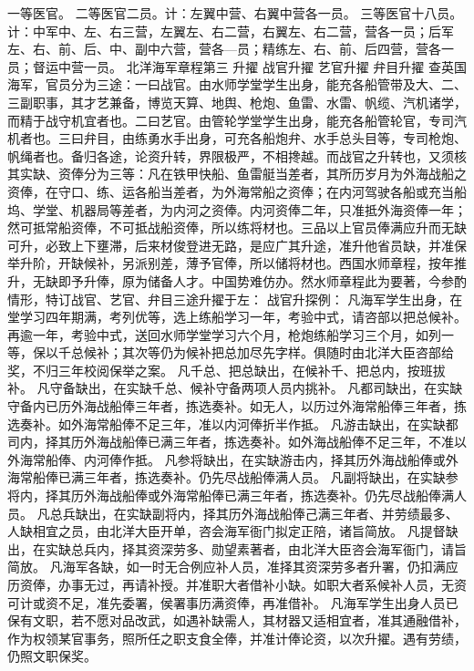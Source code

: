 \documentclass[12pt,UTF8]{ctexbook}
\begin{document}
一等医官。
二等医官二员。计：左翼中营、右翼中营各一员。
三等医官十八员。计：中军中、左、右三营，左翼左、右二营，右翼左、右二营，营各一员；后军左、右、前、后、中、副中六营，营各—员；精练左、右、前、后四营，营各一员；督运中营一员。
北洋海军章程第三
升擢 战官升擢 艺官升擢 弁目升擢
查英国海军，官员分为三途：一曰战官。由水师学堂学生出身，能充各船管带及大、二、三副职事，其才艺兼备，博览天算、地舆、枪炮、鱼雷、水雷、帆缆、汽机诸学，而精于战守机宜者也。二曰艺官。由管轮学堂学生出身，能充各船管轮官，专司汽机者也。三曰弁目，由练勇水手出身，可充各船炮弁、水手总头目等，专司枪炮、帆绳者也。备归各途，论资升转，界限极严，不相搀越。而战官之升转也，又须核其实缺、资俸分为三等：凡在铁甲快船、鱼雷艇当差者，其所历岁月为外海战船之资俸，在守口、练、运各船当差者，为外海常船之资俸；在内河驾驶各船或充当船坞、学堂、机器局等差者，为内河之资俸。内河资俸二年，只准抵外海资俸一年；然可抵常船资俸，不可抵战船资俸，所以练将材也。三品以上官员俸满应升而无缺可升，必致上下壅滞，后来材俊登进无路，是应广其升途，准升他省员缺，并准保举升阶，开缺候补，另派别差，薄予官俸，所以储将材也。西国水师章程，按年推升，无缺即予升俸，原为储备人才。中国势难仿办。然水师章程此为要著，今参酌情形，特订战官、艺官、弁目三途升擢于左：
战官升探例：
凡海军学生出身，在堂学习四年期满，考列优等，选上练船学习一年，考验中式，请咨部以把总候补。再逾一年，考验中式，送回水师学堂学习六个月，枪炮练船学习三个月，如列一等，保以千总候补；其次等仍为候补把总加尽先字样。俱随时由北洋大臣咨部给奖，不归三年校阅保举之案。
凡千总、把总缺出，在候补千、把总内，按班拔补。
凡守备缺出，在实缺千总、候补守备两项人员内挑补。
凡都司缺出，在实缺守备内已历外海战船俸三年者，拣选奏补。如无人，以历过外海常船俸三年者，拣选奏补。如外海常船俸不足三年，准以内河俸折半作抵。
凡游击缺出，在实缺都司内，择其历外海战船俸已满三年者，拣选奏补。如外海战船俸不足三年，不准以外海常船俸、内河俸作抵。
凡参将缺出，在实缺游击内，择其历外海战船俸或外海常船俸已满三年者，拣选奏补。仍先尽战船俸满人员。
凡副将缺出，在实缺参将内，择其历外海战船俸或外海常船俸已满三年者，拣选奏补。仍先尽战船俸满人员。
凡总兵缺出，在实缺副将内，择其历外海战船俸己满三年者、并劳绩最多、人缺相宜之员，由北洋大臣开单，咨会海军衙门拟定正陪，诸旨简放。
凡提督缺出，在实缺总兵内，择其资深劳多、勋望素著者，由北洋大臣咨会海军衙门，请旨简放。
凡海军各缺，如一时无合例应补人员，准择其资深劳多者升署，仍扣满应历资俸，办事无过，再请补授。并准职大者借补小缺。如职大者系候补人员，无资可计或资不足，准先委署，侯署事历满资俸，再准借补。
凡海军学生出身人员已保有文职，若不愿对品改武，如遇补缺需人，其材器又适相宜者，准其通融借补，作为权领某官事务，照所任之职支食全俸，并准计俸论资，以次升擢。遇有劳绩，仍照文职保奖。
\end{document}
